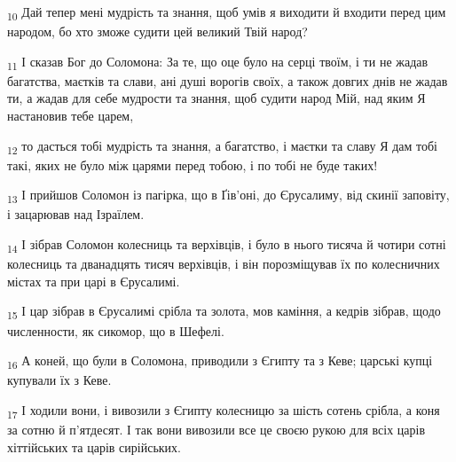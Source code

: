 \begin{tcolorbox}
\textsubscript{10} Дай тепер мені мудрість та знання, щоб умів я виходити й входити перед цим народом, бо хто зможе судити цей великий Твій народ?
\end{tcolorbox}
\begin{tcolorbox}
\textsubscript{11} І сказав Бог до Соломона: За те, що оце було на серці твоїм, і ти не жадав багатства, маєтків та слави, ані душі ворогів своїх, а також довгих днів не жадав ти, а жадав для себе мудрости та знання, щоб судити народ Мій, над яким Я настановив тебе царем,
\end{tcolorbox}
\begin{tcolorbox}
\textsubscript{12} то дасться тобі мудрість та знання, а багатство, і маєтки та славу Я дам тобі такі, яких не було між царями перед тобою, і по тобі не буде таких!
\end{tcolorbox}
\begin{tcolorbox}
\textsubscript{13} І прийшов Соломон із пагірка, що в Ґів'оні, до Єрусалиму, від скинії заповіту, і зацарював над Ізраїлем.
\end{tcolorbox}
\begin{tcolorbox}
\textsubscript{14} І зібрав Соломон колесниць та верхівців, і було в нього тисяча й чотири сотні колесниць та дванадцять тисяч верхівців, і він порозміщував їх по колесничних містах та при царі в Єрусалимі.
\end{tcolorbox}
\begin{tcolorbox}
\textsubscript{15} І цар зібрав в Єрусалимі срібла та золота, мов каміння, а кедрів зібрав, щодо численности, як сикомор, що в Шефелі.
\end{tcolorbox}
\begin{tcolorbox}
\textsubscript{16} А коней, що були в Соломона, приводили з Єгипту та з Кеве; царські купці купували їх з Кеве.
\end{tcolorbox}
\begin{tcolorbox}
\textsubscript{17} І ходили вони, і вивозили з Єгипту колесницю за шість сотень срібла, а коня за сотню й п'ятдесят. І так вони вивозили все це своєю рукою для всіх царів хіттійських та царів сирійських.
\end{tcolorbox}
